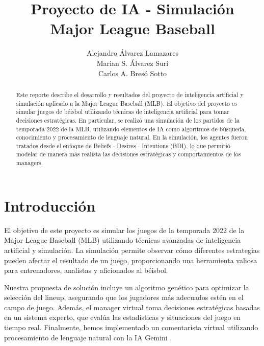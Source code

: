 \documentclass[runningheads]{llncs}
\begin{document}
\title{Proyecto de IA - Simulación \\
        Major League Baseball}

\author{Alejandro Álvarez Lamazares \\
        Marian S. Álvarez Suri \\
        Carlos A. Bresó Sotto
        }



\maketitle

\begin{abstract}
    Este reporte describe el desarrollo y resultados del proyecto de inteligencia artificial y simulación aplicado a la Major League Baseball (MLB). El objetivo del proyecto es simular juegos de béisbol utilizando técnicas de inteligencia artificial para tomar decisiones estratégicas. En particular, se realizó una simulación de los partidos de la temporada 2022 de la MLB, utilizando elementos de IA como algoritmos de búsqueda, conocimiento y procesamiento de lenguaje natural. En la simulación, los agentes fueron tratados desde el enfoque de Beliefs - Desires - Intentions (BDI), lo que permitió modelar de manera más realista las decisiones estratégicas y comportamientos de los managers.
\end{abstract}

\section{Introducción}
    El objetivo de este proyecto es simular los juegos de la temporada 2022 de la Major League Baseball (MLB) \cite{mlb} utilizando técnicas avanzadas de inteligencia artificial y simulación. La simulación permite observar cómo diferentes estrategias pueden afectar el resultado de un juego, proporcionando una herramienta valiosa para entrenadores, analistas y aficionados al béisbol.
    
    Nuestra propuesta de solución incluye un algoritmo genético para optimizar la selección del lineup, asegurando que los jugadores más adecuados estén en el campo de juego. Además, el manager virtual toma decisiones estratégicas basadas en un sistema experto, que evalúa las estadísticas y situaciones del juego en tiempo real. Finalmente, hemos implementado un comentarista virtual utilizando procesamiento de lenguaje natural con la IA Gemini \cite{gemini}.
\end{document}
